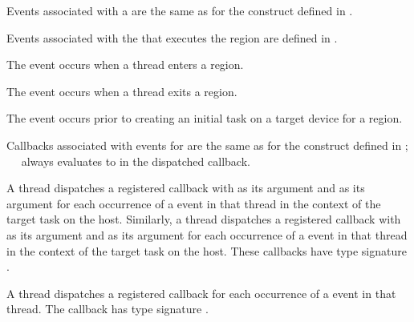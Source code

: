 \events

Events associated with a  are the same as for the  
construct defined in .

Events associated with the  that executes the  
region are defined in .

The  event occurs when a thread enters a  region.

The  event occurs when a thread exits a  region.

The  event occurs prior to creating an initial task on 
a target device for a  region.

\tools

Callbacks associated with events for  are the same as
for the  construct defined in ;
\code{(}~\code{&}~ 
always evaluates to  in the dispatched callback.

A thread dispatches a registered  callback with 
 as its  argument and  as 
its  argument for each occurrence of a  event in that 
thread in the context of the target task on the host. Similarly, a thread dispatches 
a registered  callback with  as its 
 argument and  as its  argument for each 
occurrence of a  event in that thread in the context of the target 
task on the host. These callbacks have type signature . 

A thread dispatches a registered  callback for 
each occurrence of a  event in that thread. The callback has 
type signature .

